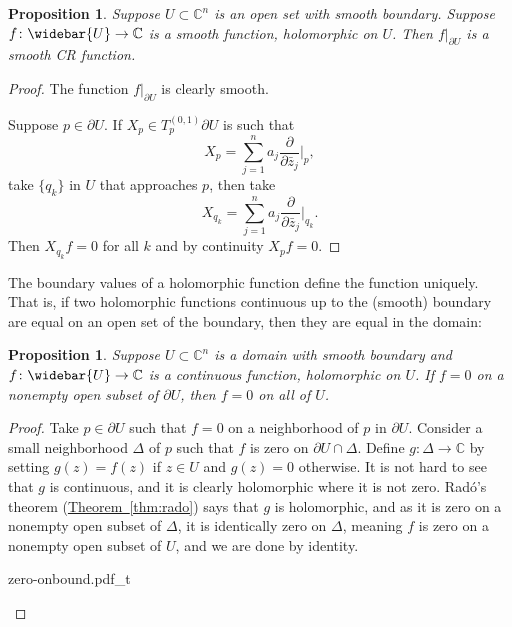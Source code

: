 \documentclass[12pt,openany]{book}
\newcommand{\C}{{\mathbb{C}}}
\theoremstyle{plain}
\newtheorem{prop}[thm]{Proposition}
\theoremstyle{remark}
\theoremstyle{definition}
\newenvironment{myfig}{%
    \begin{center}
}{%
    \end{center}
}
\theoremstyle{exercise}
\theoremstyle{example}
\newcommand{\thmref}[1]{\hyperref[#1]{Theorem~\ref*{#1}}}
\begin{document}
\begin{prop} \label{prop:boundaryvaluesCR}
Suppose $U \subset \C^n$ is an open set with smooth boundary.  Suppose
$f \colon \widebar{U} \to \C$ is a smooth function, holomorphic on $U$.
Then $f|_{\partial U}$ is a smooth CR function.
\end{prop}

\begin{proof}
The function $f|_{\partial U}$ is clearly smooth.

Suppose $p \in \partial U$.
If $X_p \in T_p^{(0,1)} \partial U$ is such that
\begin{equation*}
X_p = \sum_{j=1}^n a_j \frac{\partial}{\partial \bar{z}_j} \Big|_p ,
\end{equation*}
take $\{ q_k \}$ in $U$ that approaches $p$, then take
\begin{equation*}
X_{q_k} = \sum_{j=1}^n a_j \frac{\partial}{\partial \bar{z}_j} \Big|_{q_k} .
\end{equation*}
Then $X_{q_k} f = 0$ for all $k$ and by continuity $X_p f = 0$.
\end{proof}

\pagebreak[2]
The boundary values of a holomorphic function define the function uniquely.
That is, if two holomorphic functions continuous up to the (smooth) boundary
are equal on an open set of the boundary, then they are equal in the domain:

\begin{prop} \label{prop:boundaryvaluesdeterminef}
Suppose $U \subset \C^n$ is a domain with smooth boundary and $f \colon
\widebar{U} \to \C$ is 
a continuous function, holomorphic on $U$.  If $f=0$ on a nonempty open subset of $\partial
U$, then $f=0$ on all of $U$.
\end{prop}

\begin{proof}
Take $p \in \partial U$ such that $f=0$ on a neighborhood of $p$ in
$\partial U$.  Consider a small neighborhood $\Delta$ of $p$ such
that $f$ is zero on $\partial U \cap \Delta$.  Define $g \colon \Delta \to
\C$ by setting $g(z) = f(z)$ if $z \in U$ and $g(z) = 0$ otherwise.
It is not hard to see that $g$ is continuous, and it is clearly holomorphic
where it is not zero.  Rad{\'o}'s theorem
(\thmref{thm:rado}) says that $g$ is holomorphic, and as it is zero on a
nonempty open subset of $\Delta$, it is identically zero on $\Delta$,
meaning $f$ is zero on a nonempty open subset of $U$, and we are done by
identity.

\begin{myfig}
{zero-onbound.pdf_t}
\end{myfig}
\end{proof}
\end{document}
